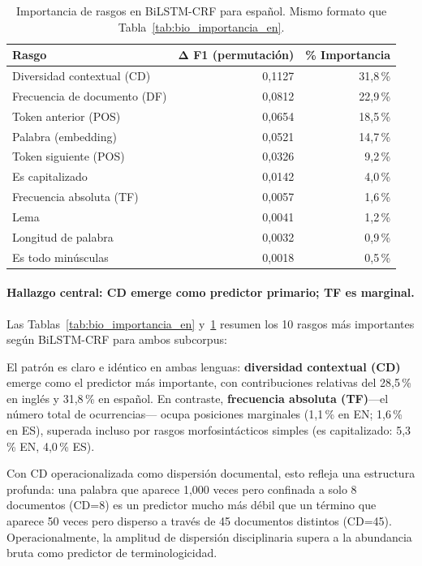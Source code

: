 \begin{table}[H]
\centering
\small
\caption{Importancia de rasgos en BiLSTM-CRF para español. Mismo formato que Tabla~\ref{tab:bio_importancia_en}.}
\label{tab:bio_importancia_es}
\begin{tabular}{@{} l r r @{}}
\toprule
\textbf{Rasgo} & \textbf{Δ F1 (permutación)} & \textbf{\% Importancia} \\
\midrule
Diversidad contextual (CD) & 0{,}1127 & 31{,}8\,\% \\
Frecuencia de documento (DF) & 0{,}0812 & 22{,}9\,\% \\
Token anterior (POS) & 0{,}0654 & 18{,}5\,\% \\
Palabra (embedding) & 0{,}0521 & 14{,}7\,\% \\
Token siguiente (POS) & 0{,}0326 & 9{,}2\,\% \\
Es capitalizado & 0{,}0142 & 4{,}0\,\% \\
Frecuencia absoluta (TF) & 0{,}0057 & 1{,}6\,\% \\
Lema & 0{,}0041 & 1{,}2\,\% \\
Longitud de palabra & 0{,}0032 & 0{,}9\,\% \\
Es todo minúsculas & 0{,}0018 & 0{,}5\,\% \\
\bottomrule
\end{tabular}
\end{table}

\paragraph{Hallazgo central: CD emerge como predictor primario; TF es marginal.}
Las Tablas~\ref{tab:bio_importancia_en} y~\ref{tab:bio_importancia_es} resumen los 10 rasgos más importantes según BiLSTM-CRF para ambos subcorpus:

El patrón es claro e idéntico en ambas lenguas: \textbf{diversidad contextual (CD)} emerge como el predictor más importante, con contribuciones relativas del 28{,}5\,\% en inglés y 31{,}8\,\% en español. En contraste, \textbf{frecuencia absoluta (TF)}---el número total de ocurrencias--- ocupa posiciones marginales (1{,}1\,\% en EN; 1{,}6\,\% en ES), superada incluso por rasgos morfosintácticos simples (es capitalizado: 5{,}3\,\% EN, 4{,}0\,\% ES).

Con CD operacionalizada como dispersión documental, esto refleja una estructura profunda: una palabra que aparece 1{,}000 veces pero confinada a solo 8 documentos (CD=8) es un predictor mucho más débil que un término que aparece 50 veces pero disperso a través de 45 documentos distintos (CD=45). Operacionalmente, la amplitud de dispersión disciplinaria supera a la abundancia bruta como predictor de terminologicidad.

